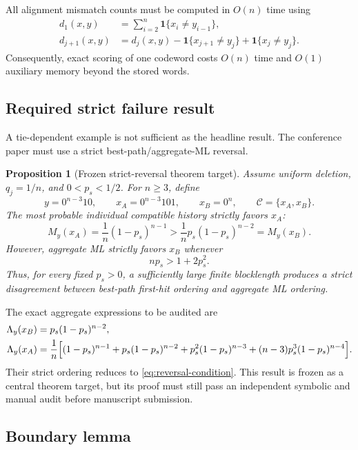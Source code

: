 \documentclass[11pt]{article}
\newtheorem{proposition}[theorem]{Proposition}
\theoremstyle{definition}
\theoremstyle{remark}
\newcommand{\C}{\mathcal{C}}
\newcommand{\ind}{\mathbf{1}}
\begin{document}
All alignment mismatch counts must be computed in $O(n)$ time using
\begin{align}
 d_1(x,y)
 &=\sum_{i=2}^{n}\ind\{x_i\ne y_{i-1}\},\\
 d_{j+1}(x,y)
 &=d_j(x,y)
 -\ind\{x_{j+1}\ne y_j\}
 +\ind\{x_j\ne y_j\}.
 \label{eq:recurrence}
\end{align}
Consequently, exact scoring of one codeword costs $O(n)$ time and $O(1)$ auxiliary memory beyond the stored words.

\subsection{Required strict failure result}

A tie-dependent example is not sufficient as the headline result. The conference paper must use a strict best-path/aggregate-ML reversal.

\begin{proposition}[Frozen strict-reversal theorem target]
\label{prop:strict}
Assume uniform deletion, $q_j=1/n$, and $0<p_s<1/2$. For $n\ge3$, define
\[
y=0^{n-3}10,
\qquad
x_A=0^{n-3}101,
\qquad
x_B=0^n,
\qquad
\C=\{x_A,x_B\}.
\]
The most probable individual compatible history strictly favors $x_A$:
\[
M_y(x_A)=\frac1n(1-p_s)^{n-1}
>
\frac1n p_s(1-p_s)^{n-2}=M_y(x_B).
\]
However, aggregate ML strictly favors $x_B$ whenever
\begin{equation}
np_s>1+2p_s^2.
\label{eq:reversal-condition}
\end{equation}
Thus, for every fixed $p_s>0$, a sufficiently large finite blocklength produces a strict disagreement between best-path first-hit ordering and aggregate ML ordering.
\end{proposition}

The exact aggregate expressions to be audited are
\begin{align}
\Lambda_y(x_B)
&=p_s(1-p_s)^{n-2},\\
\Lambda_y(x_A)
&=\frac1n\Bigl[
(1-p_s)^{n-1}
+p_s(1-p_s)^{n-2}
+p_s^2(1-p_s)^{n-3}
+(n-3)p_s^3(1-p_s)^{n-4}
\Bigr].
\end{align}
Their strict ordering reduces to \cref{eq:reversal-condition}. This result is frozen as a central theorem target, but its proof must still pass an independent symbolic and manual audit before manuscript submission.

\subsection{Boundary lemma}
\end{document}
